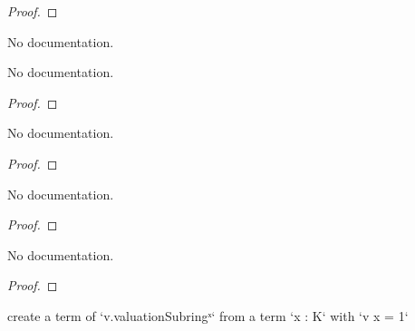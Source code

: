\begin{proof}
    \leanok
\end{proof}

\begin{theorem}\label{WithZero.ofAdd_eq_neg_one_of_pow_eq_neg_one}
                No documentation.
    \end{theorem}

\begin{lemma}\label{eq_one_of_eq_one_of_le_one_le_one}
        \leanok
                No documentation.
    \end{lemma}

\begin{proof}
    \leanok
\end{proof}

\begin{theorem}\label{map_zpow}
        \leanok
                No documentation.
    \end{theorem}

\begin{proof}
    \leanok
\end{proof}

\begin{theorem}\label{val_valuationSubring_unit}
        \leanok
                No documentation.
    \end{theorem}

\begin{proof}
    \leanok
\end{proof}

\begin{theorem}\label{isUnit_in_valuationSubring_of_val_eq_one}
        \leanok
                No documentation.
    \end{theorem}

\begin{proof}
    \leanok
\end{proof}

\begin{theorem}\label{unitOfValOne_elem}
        \leanok
                create a term of `v.valuationSubringˣ` from a term `x : K` with `v x = 1`
    \end{theorem}

